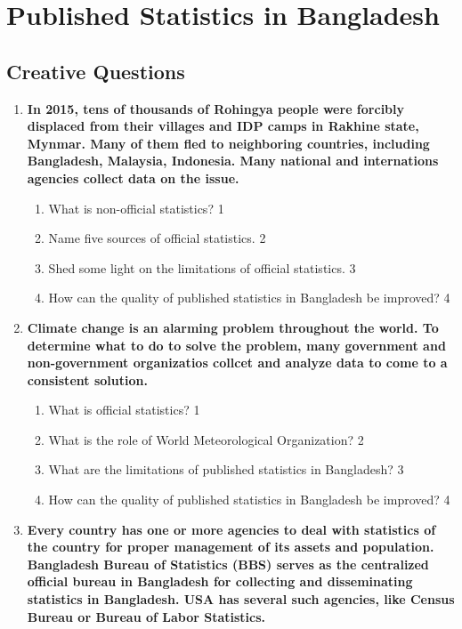 \documentclass[a4paper,oneside]{book}
\begin{document}
\chapter{Published Statistics in Bangladesh} 
\section{Creative Questions}

  \begin{enumerate}
 \item
	  \textbf{In 2015, tens of thousands of Rohingya people were forcibly displaced from their villages and IDP camps in Rakhine state, Mynmar. Many of them fled to neighboring countries, including Bangladesh, Malaysia, Indonesia. Many national and internations agencies collect data on the issue.} 
  
  \begin{enumerate}
    \item
	What is non-official statistics? \hfill 1
    \item
	Name five sources of official statistics. \hfill 2
    \item  
	Shed some light on the limitations of official statistics. \hfill 3
    \item
	How can the quality of published statistics in Bangladesh be improved? \hfill 4
  \end{enumerate}
  
   \item
	  \textbf{Climate change is an alarming problem throughout the world. To determine what to do to solve the problem, many government and non-government organizatios collcet and analyze data  to come to a consistent solution.} 
  
  \begin{enumerate}
    \item
	What is official statistics?  \hfill 1
    \item
	What is the role of World Meteorological Organization? \hfill 2
    \item  
	What are the limitations of published statistics in Bangladesh? \hfill 3
    \item
	How can the quality of published statistics in Bangladesh be improved? \hfill 4
  \end{enumerate}


   \item
	  \textbf{Every country has one or more agencies to deal with statistics of 
	  the country for proper management of its assets and population. Bangladesh
	  Bureau of Statistics (BBS) serves as the centralized official bureau in 
	  Bangladesh for collecting and disseminating statistics in Bangladesh. 
	  USA has several such agencies, like Census Bureau or Bureau of Labor 
	  Statistics.} 
  

\end{enumerate}
\end{document}
